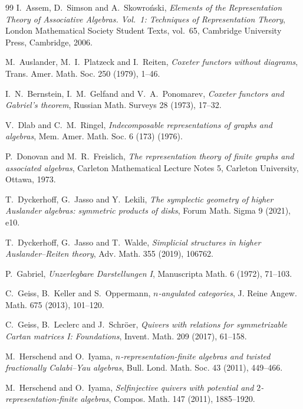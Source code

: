 \documentclass[11pt,a4paper]{amsart}
\theoremstyle{definition}
\numberwithin{equation}{section}
\newcommand{\0}{\mathbf{0}}
\begin{document}
	
	

	


		
		\begin{thebibliography}{99}
		I.~Assem, D.~Simson and A.~Skowro\'nski,
		\emph{Elements of the Representation Theory of Associative Algebras.
			Vol.~1: Techniques of Representation Theory},
		London Mathematical Society Student Texts, vol.~65,
		Cambridge University Press, Cambridge, 2006.
		
		M.~Auslander, M.~I.~Platzeck and I.~Reiten,
		\emph{Coxeter functors without diagrams},
		Trans. Amer. Math. Soc. {250} (1979), 1--46.
		
		I.~N.~Bernstein, I.~M.~Gelfand and V.~A.~Ponomarev,
		\emph{Coxeter functors and Gabriel's theorem},
		Russian Math. Surveys {28} (1973), 17--32.
		
		
		V.~Dlab and C.~M.~Ringel,
		\emph{Indecomposable representations of graphs and algebras},
		Mem. Amer. Math. Soc. {6} (173) (1976).
		
		P.~Donovan and M.~R.~Freislich,
		\emph{The representation theory of finite graphs and associated algebras},
		Carleton Mathematical Lecture Notes 5,
		Carleton University, Ottawa, 1973.
		
		
		T.~Dyckerhoff, G.~Jasso and Y.~Lekili,
		\emph{The symplectic geometry of higher Auslander algebras:
			symmetric products of disks},
		Forum Math. Sigma {9} (2021), e10.
		
		T.~Dyckerhoff, G.~Jasso and T.~Walde,
		\emph{Simplicial structures in higher Auslander--Reiten theory},
		Adv. Math. {355} (2019), 106762.
		
		P.~Gabriel,
		\emph{Unzerlegbare Darstellungen I},
		Manuscripta Math. {6}  (1972), 71--103.
		
		C.~Geiss, B.~Keller and S.~Oppermann,
		\emph{$n$-angulated categories},
		J. Reine Angew. Math. {675} (2013), 101--120.
		
		C.~Geiss, B.~Leclerc and J.~Schr\"oer,
		\emph{Quivers with relations for symmetrizable Cartan matrices
			I: Foundations},
		Invent. Math. {209}  (2017), 61--158.
		
		M.~Herschend and O.~Iyama,
		\emph{$n$-representation-finite algebras and twisted fractionally
			Calabi--Yau algebras},
		Bull. Lond. Math. Soc. {43}  (2011), 449--466.
		
		M.~Herschend and O.~Iyama,
		\emph{Selfinjective quivers with potential and
			$2$-representation-finite algebras},
		Compos. Math. {147} (2011), 1885--1920.
		

\end{thebibliography}
\end{document}
